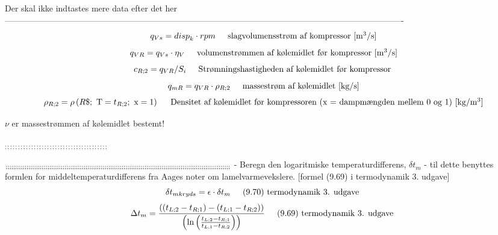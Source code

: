 \documentclass[../Hovedrapport.tex]{subfiles}
\newcommand{\F}[1]{\mbox{$#1$}}
\newcommand{\V}[1]{\mbox{$ #1 $}}
\newcommand{\I}{\mbox{\hspace{0.20in}}}
\newcommand{\density}{\mathrm{\rho}}
\begin{document}
\vspace{0.10in}
\noindent
\rm Der skal ikke indtastes mere data efter det her----------------------------------------------------------------------------------------------------------------------------------------------
\begin{equation}
\label{EES Eqn:32}
q_{Vs} = \V{disp} _{k}\cdot \V{rpm	}  
\mbox{\I slagvolumensstrøm af kompressor [m$^{3}$/s]}
\end{equation}
\begin{equation}
\label{EES Eqn:33}
q_{VR} = q_{Vs}\cdot \eta_{V	} 
\mbox{\I volumenstrømmen af kølemidlet før kompressor [m$^{3}$/s]}
\end{equation}
\begin{equation}
\label{EES Eqn:34}
c_{R;2} = q_{VR}/S_{i	} 
\mbox{\I Strømningshastigheden af kølemidlet før kompressor }
\end{equation}
\begin{equation}
\label{EES Eqn:35}
q_{mR} = q_{VR} \cdot  \rho_{R;2} 	 
\mbox{\I massestrøm af kølemidlet [kg/s]}
\end{equation}
\begin{equation}
\label{EES Eqn:36}
\rho_{R;2} = \density \left(\F{R}\$;\mbox{\ T}=t_{R;2};\mbox{\ x}=1 \right) 	 
\mbox{\I Densitet af kølemidlet før kompressoren (x = dampmængden mellem 0 og 1) [kg/m$^{3}$]}
\end{equation}



\vspace{0.10in}
\noindent
\rm $\nu$ er massestrømmen af kølemidlet bestemt!

\vspace{0.10in}
\noindent
\rm $_{;;;;;;;;;;;;;;;;;;;;;;;;;;;;;;;;;;;;;;;}$

\vspace{0.10in}
\noindent
\rm $_{;;;;;;;;;;;;;;;;;;;;;;;;;;;;;;;;;;;;;;;;;;;;;;;;;;;;;;;;;;;;;;;;;;;;;;;;;;;;;;;;;;;;;;;;;;;;;;;;;;;;;;;;;;;;;;;;;;;;;;\newline}$
  - Beregn den logaritmiske temperaturdifferens, ${\delta t}$$_{m}$\newline
  - til dette benyttes formlen for middeltemperaturdifferens fra Aages noter om lamelvarmevekslere. [formel (9.69) i termodynamik 3. udgave]
\begin{equation}
\label{EES Eqn:37}
{\delta t}_{mkryds} = \epsilon \cdot  {\delta t}_{m		} 
\mbox{\I (9.70) termodynamik 3. udgave }
\end{equation}
\begin{equation}
\label{EES Eqn:38}
{\Delta t}_{m} = \frac { \left(  \left( t_{L;2} - t_{R;1} \right)  -  \left( t_{L;1} - t_{R;2} \right)  \right) }{  \left( \ln{ \left( \frac {t_{L;2} - t_{R;1}}{ t_{L;1} - t_{R;2} } \right) } \right) 	 } 
\mbox{\I (9.69) termodynamik 3. udgave }
\end{equation}
\end{document}
